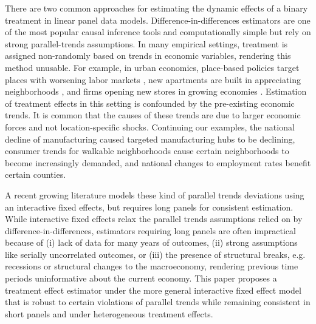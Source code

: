 \documentclass[12pt]{article}
\begin{document}
There are two common approaches for estimating the dynamic effects of a binary treatment in linear panel data models. Difference-in-differences estimators are one of the most popular causal inference tools and computationally simple but rely on strong parallel-trends assumptions. In many empirical settings, treatment is assigned non-randomly based on trends in economic variables, rendering this method unusable. For example, in urban economics, place-based policies target places with worsening labor markets \citep{neumark2015place}, new apartments are built in appreciating neighborhoods \citep{asquith2021local,pennington2021does}, and firms opening new stores in growing economies \citep{basker2005job,neumark2008effects}. Estimation of treatment effects in this setting is confounded by the pre-existing economic trends. It is common that the causes of these trends are due to larger economic forces and not location-specific shocks. Continuing our examples, the national decline of manufacturing caused targeted manufacturing hubs to be declining, consumer trends for walkable neighborhoods cause certain neighborhoods to become increasingly demanded, and national changes to employment rates benefit certain counties. 

A recent growing literature models these kind of parallel trends deviations using an interactive fixed effects, but requires long panels for consistent estimation. While interactive fixed effects relax the parallel trends assumptions relied on by difference-in-differences, estimators requiring long panels are often impractical because of (i) lack of data for many years of outcomes, (ii) strong assumptions like serially uncorrelated outcomes, or (iii) the presence of structural breaks, e.g. recessions or structural changes to the macroeconomy, rendering previous time periods uninformative about the current economy. This paper proposes a treatment effect estimator under the more general interactive fixed effect model that is robust to certain violations of parallel trends while remaining consistent in short panels and under heterogeneous treatment effects. 
\end{document}
